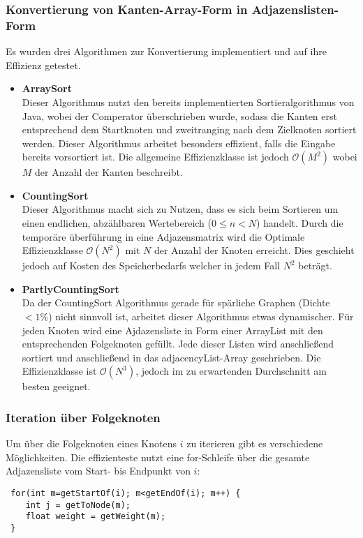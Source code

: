 \documentclass[a4paper,10pt]{article}
\begin{document}
\subsubsection{Konvertierung von Kanten-Array-Form in Adjazenslisten-Form}
Es wurden drei Algorithmen zur Konvertierung implementiert und auf ihre Effizienz getestet.

\begin{itemize}
\item\textbf{ArraySort}\\
Dieser Algorithmus nutzt den bereits implementierten Sortieralgorithmus von Java, wobei der Comperator überschrieben wurde,
sodass die Kanten erst entsprechend dem Startknoten und zweitranging nach dem Zielknoten sortiert werden. Dieser Algorithmus arbeitet
besonders effizient, falls die Eingabe bereits vorsortiert ist. Die allgemeine Effizienzklasse ist jedoch $\mathcal{O}(M^2)$ wobei $M$ der Anzahl der Kanten beschreibt.
\item\textbf{CountingSort}\\
Dieser Algorithmus macht sich zu Nutzen, dass es sich beim Sortieren um einen endlichen, abzählbaren Wertebereich ($0 \le n < N$) handelt.
Durch die temporäre überführung in eine Adjazensmatrix wird die Optimale Effizienzklasse $\mathcal{O}(N^2)$ mit $N$ der Anzahl der Knoten erreicht.
Dies geschieht jedoch auf Kosten des Speicherbedarfs welcher in jedem Fall $N^2$ beträgt.
\item\textbf{PartlyCountingSort}\\
Da der CountingSort Algorithmus gerade für spärliche Graphen (Dichte $< 1\%$) nicht sinnvoll ist, arbeitet dieser Algorithmus etwas dynamischer.
Für jeden Knoten wird eine Ajdazensliste in Form einer ArrayList mit den entsprechenden Folgeknoten gefüllt. Jede dieser Listen wird anschließend sortiert
und anschließend in das adjacencyList-Array geschrieben. Die Effizienzklasse ist $\mathcal{O}(N^3)$, jedoch im zu erwartenden Durchschnitt am besten geeignet.
\end{itemize}

\subsubsection{Iteration über Folgeknoten}
Um über die Folgeknoten eines Knotens $i$ zu iterieren gibt es verschiedene Möglichkeiten.
Die effizienteste nutzt eine for-Schleife über die gesamte Adjazensliste vom Start- bis Endpunkt von $i$:
\begin{lstlisting}
 for(int m=getStartOf(i); m<getEndOf(i); m++) {
    int j = getToNode(m);
    float weight = getWeight(m);
 }
\end{lstlisting}
\end{document}
